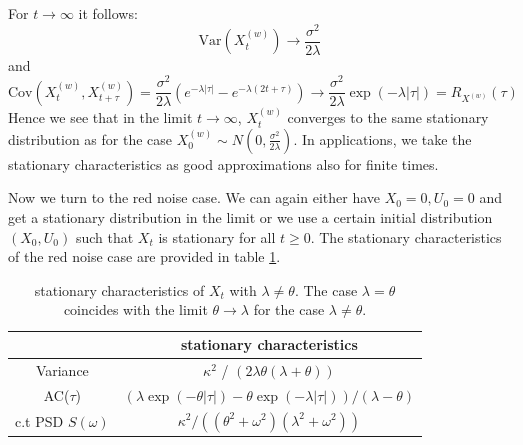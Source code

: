 \documentclass[%
thesis=student,%
coverpage=false,%
titlepage=false,%
headmarks=true, %
english,%
font=libertine, %
math=newpxtx, %
BCOR=5mm,%
coverBCOR=11mm%
]{tumbook}
\begin{document}
For $t\rightarrow \infty$ it follows: 
\[
\text{Var}(X_{t}^{(w)})\rightarrow\frac{\sigma^2}{2\lambda}
\]
and 
\[
\text{Cov}(X_{t}^{(w)},X_{t+\tau}^{(w)}) = \frac{\sigma^2}{2\lambda}(e^{-\lambda\lvert \tau \rvert} - e^{-\lambda(2t + \tau)}) \rightarrow \frac{\sigma ^2}{2\lambda}\exp(-\lambda\lvert \tau \rvert) = R_{X^{(w)}}(\tau)
\]
Hence we see that in the limit $t\rightarrow \infty$, $X_{t}^{(w)}$ converges to the same stationary distribution as for the case $X_{0}^{(w)} \sim N(0,\frac{\sigma^2}{2\lambda})$. 
In applications, we take the stationary characteristics as good approximations also for finite times.

Now we turn to the red noise case. We can again either have $X_{0} = 0, U_{0} = 0$ and get a stationary distribution in the limit or we use a certain initial distribution $(X_{0},U_{0})$ such that $X_{t}$ is stationary for all $t \geq 0$. The stationary characteristics of the red noise case are provided in table \ref{tab:red_noise_stat_char}.

\begin{table}[h!]
\centering
\begin{tabular}{|c|c|}
\hline
& stationary characteristics\\
\hline
Variance & $\kappa^2$ / $(2\lambda\theta(\lambda + \theta))$\\
AC($\tau$) & $(\lambda\exp(-\theta\lvert\tau\rvert)-\theta\exp(-\lambda\lvert\tau\rvert))/(\lambda - \theta)$\\
c.t PSD $S(\omega)$ & $\kappa^2/((\theta^2 + \omega^2)(\lambda^2 + \omega^2))$\\
\hline
\end{tabular}
\caption{stationary characteristics of $X_{t}$ with $\lambda \neq \theta$. The case $\lambda = \theta$ coincides with the limit $\theta \rightarrow \lambda$ for the case $\lambda \neq \theta$.}
\label{tab:red_noise_stat_char}
\end{table}
\end{document}
